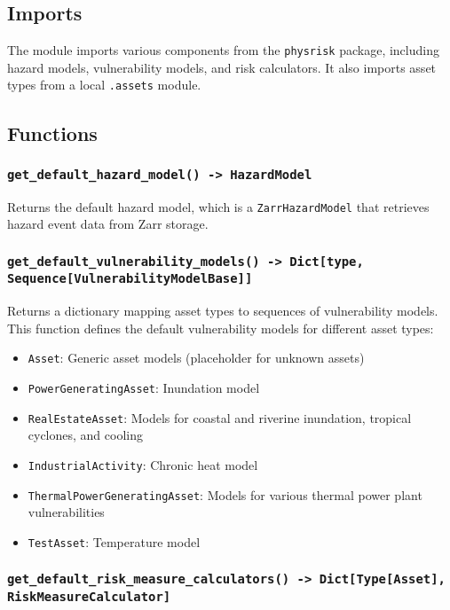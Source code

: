 \documentclass{article}
\begin{document}
\subsection{Imports}

The module imports various components from the \texttt{physrisk} package, including hazard models, vulnerability models, and risk calculators. It also imports asset types from a local \texttt{.assets} module.

\subsection{Functions}

\subsubsection{\texttt{get\_default\_hazard\_model() -> HazardModel}}

Returns the default hazard model, which is a \texttt{ZarrHazardModel} that retrieves hazard event data from Zarr storage.

\subsubsection{\texttt{get\_default\_vulnerability\_models() -> Dict[type, Sequence[VulnerabilityModelBase]]}}

Returns a dictionary mapping asset types to sequences of vulnerability models. This function defines the default vulnerability models for different asset types:

\begin{itemize}
    \item \texttt{Asset}: Generic asset models (placeholder for unknown assets)
    \item \texttt{PowerGeneratingAsset}: Inundation model
    \item \texttt{RealEstateAsset}: Models for coastal and riverine inundation, tropical cyclones, and cooling
    \item \texttt{IndustrialActivity}: Chronic heat model
    \item \texttt{ThermalPowerGeneratingAsset}: Models for various thermal power plant vulnerabilities
    \item \texttt{TestAsset}: Temperature model
\end{itemize}

\subsubsection{\texttt{get\_default\_risk\_measure\_calculators() -> Dict[Type[Asset], RiskMeasureCalculator]}}
\end{document}
